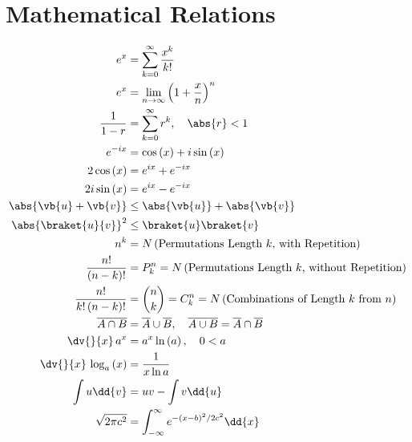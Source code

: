 \section{Mathematical Relations}
\label{misc:math}

\begin{subequations}\label{eq:misc:math}
\begin{align}
e^{x} &= \sum_{k=0}^{\infty} \frac{x^{k}}{k!} \label{eq:misc:math:ex} \\
e^{x} &= \lim_{n \to \infty} \left(1 + \frac{x}{n}\right)^{n} \label{eq:misc:math:ex_limit} \\
\frac{1}{1-r} &= \sum_{k=0}^{\infty} r^{k}, \quad \abs{r} < 1 \label{eq:misc:math:geometric} \\
e^{-i x} &= \cos\left(x\right) + i \sin\left(x\right) \label{eq:misc:math:eulers_formula} \\
2 \cos\left(x\right) &= e^{i x} + e^{-i x} \label{eq:misc:math:cos_exp} \\
2i \sin\left(x\right) &= e^{i x} - e^{-i x} \label{eq:misc:math:sin_exp} \\
\abs{\vb{u} + \vb{v}} &\leq \abs{\vb{u}} + \abs{\vb{v}} \label{eq:misc:math:triangle_inequality} \\
\abs{\braket{u}{v}}^{2} &\leq \braket{u} \braket{v} \label{eq:misc:math:cauchy_schwarz_inequality} \\
n^{k} &= N\left(\text{Permutations Length $k$, with Repetition}\right) \label{eq:misc:math:permutations_with_repetition} \\
\frac{n!}{\left(n-k\right)!} &= P_{k}^{n} = N\left(\text{Permutations Length $k$, without Repetition}\right) \label{eq:misc:math:permutations_without_repetition} \\
\frac{n!}{k!\left(n-k\right)!} &= \binom{n}{k} = C_{k}^{n} = N\left(\text{Combinations of Length $k$ from $n$}\right) \label{eq:misc:math:binomial_coefficient} \\
\overline{A \cap B} &= \overline{A} \cup \overline{B},\quad \overline{A \cup B} = \overline{A} \cap \overline{B} \label{eq:misc:math:de_morgan} \\
\dv{}{x}\, a^{x} &= a^{x} \ln\left(a\right), \quad 0 < a \label{eq:misc:math:diff_exp_gen} \\
\dv{}{x}\, \log_{a}\left(x\right) &= \frac{1}{x \ln a} \label{eq:misc:math:diff_log_gen} \\
\int u \dd{v} &= uv - \int v \dd{u} \label{eq:misc:math:integration_by_parts} \\
\sqrt{2 \pi c^{2}} &= \int_{-\infty}^{\infty} e^{-\left(x-b\right)^{2} / 2 c^{2}} \dd{x} \label{eq:misc:math:gaussian_integral}
\end{align}
\end{subequations}

